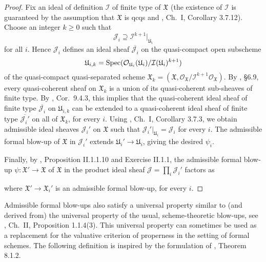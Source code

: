 \documentclass[12pt,twoside,a4paper]{article}
\theoremstyle{definition}
\theoremstyle{remark}
\newcommand\Spec{{\rm Spec}}
\begin{document}
\begin{proof}Fix an ideal of definition $\mathcal{I}$ of finite type of $\mathfrak{X}$ (the existence of $\mathcal{I}$ is guaranteed by the assumption that $\mathfrak{X}$ is qcqs and \cite{FK}, Ch.~I, Corollary 3.7.12). Choose an integer $k\geq 0$ such that \begin{equation*}\mathcal{J}_{i}\supseteq \mathcal{I}^{k+1}\vert_{\mathfrak{U}_{i}}\end{equation*}for all $i$. Hence $\mathcal{J}_{i}$ defines an ideal sheaf $\overline{\mathcal{J}_{i}}$ on the quasi-compact open subscheme \begin{equation*}\mathfrak{U}_{i,k}=\Spec(\mathcal{O}_{\mathfrak{U}_{i}}(\mathfrak{U}_{i})/\mathcal{I}(\mathfrak{U}_{i})^{k+1})\end{equation*}of the quasi-compact quasi-separated scheme $\mathfrak{X}_{k}=(\mathfrak{X}, \mathcal{O}_{\mathfrak{X}}/\mathcal{I}^{k+1}\mathcal{O}_{\mathfrak{X}})$. By \cite{EGAIb}, \S6.9, every quasi-coherent sheaf on $\mathfrak{X}_{k}$ is a union of its quasi-coherent sub-sheaves of finite type. By \cite{EGAIa}, Cor.~9.4.3, this implies that the quasi-coherent ideal sheaf of finite type $\overline{\mathcal{J}_{i}}$ on $\mathfrak{U}_{i,k}$ can be extended to a quasi-coherent ideal sheaf of finite type $\overline{\mathcal{J}_{i}'}$ on all of $\mathfrak{X}_{k}$, for every $i$. Using \cite{FK}, Ch.~I, Corollary 3.7.3, we obtain admissible ideal sheaves $\mathcal{J}_{i}'$ on $\mathfrak{X}$ such that $\mathcal{J}_{i}'\vert_{\mathfrak{U}_{i}}=\mathcal{J}_{i}$ for every $i$. The admissible formal blow-up of $\mathfrak{X}$ in $\mathcal{J}_{i}'$ extends $\mathfrak{U}_{i}'\to \mathfrak{U}_{i}$, giving the desired $\psi_{i}$. 

Finally, by \cite{FK}, Proposition II.1.1.10 and Exercise II.1.1, the admissible formal blow-up $\psi: \mathfrak{X}'\to\mathfrak{X}$ of $\mathfrak{X}$ in the product ideal sheaf $\mathcal{J}=\prod_{i}\mathcal{J}_{i}'$ factors as\begin{center}\end{center}where $\mathfrak{X}'\to \mathfrak{X}_{i}'$ is an admissible formal blow-up, for every $i$.\end{proof}
Admissible formal blow-ups also satisfy a universal property similar to (and derived from) the universal property of the usual, scheme-theoretic blow-ups, see \cite{FK}, Ch.~II, Proposition 1.1.4(3). This universal property can sometimes be used as a replacement for the valuative criterion of properness in the setting of formal schemes. The following definition is inspired by the formulation of \cite{BhattNotes}, Theorem 8.1.2. 
\end{document}
